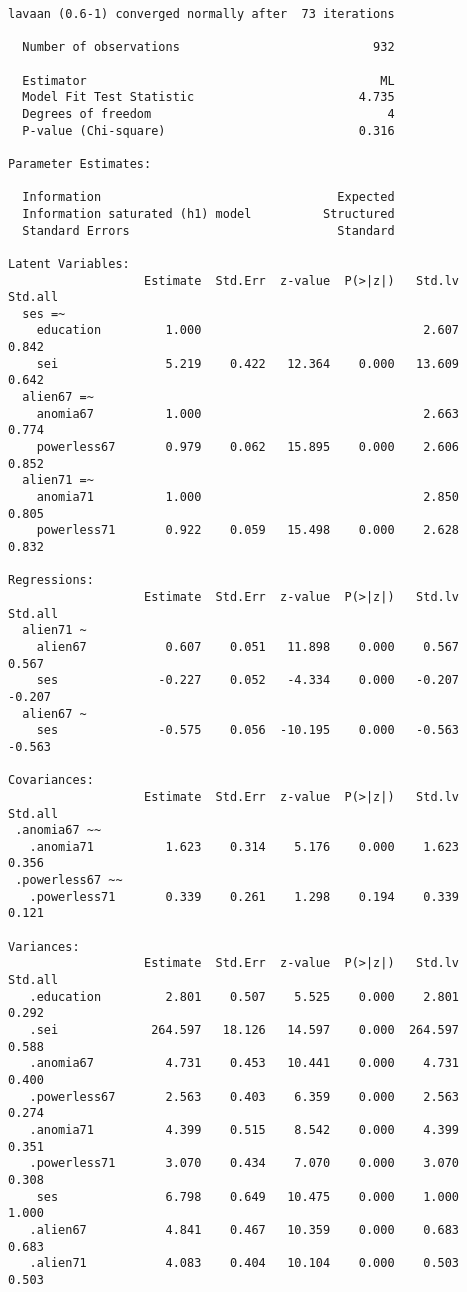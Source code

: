 \begin{verbatim}
lavaan (0.6-1) converged normally after  73 iterations

  Number of observations                           932

  Estimator                                         ML
  Model Fit Test Statistic                       4.735
  Degrees of freedom                                 4
  P-value (Chi-square)                           0.316

Parameter Estimates:

  Information                                 Expected
  Information saturated (h1) model          Structured
  Standard Errors                             Standard

Latent Variables:
                   Estimate  Std.Err  z-value  P(>|z|)   Std.lv  Std.all
  ses =~                                                                
    education         1.000                               2.607    0.842
    sei               5.219    0.422   12.364    0.000   13.609    0.642
  alien67 =~                                                            
    anomia67          1.000                               2.663    0.774
    powerless67       0.979    0.062   15.895    0.000    2.606    0.852
  alien71 =~                                                            
    anomia71          1.000                               2.850    0.805
    powerless71       0.922    0.059   15.498    0.000    2.628    0.832

Regressions:
                   Estimate  Std.Err  z-value  P(>|z|)   Std.lv  Std.all
  alien71 ~                                                             
    alien67           0.607    0.051   11.898    0.000    0.567    0.567
    ses              -0.227    0.052   -4.334    0.000   -0.207   -0.207
  alien67 ~                                                             
    ses              -0.575    0.056  -10.195    0.000   -0.563   -0.563

Covariances:
                   Estimate  Std.Err  z-value  P(>|z|)   Std.lv  Std.all
 .anomia67 ~~                                                           
   .anomia71          1.623    0.314    5.176    0.000    1.623    0.356
 .powerless67 ~~                                                        
   .powerless71       0.339    0.261    1.298    0.194    0.339    0.121

Variances:
                   Estimate  Std.Err  z-value  P(>|z|)   Std.lv  Std.all
   .education         2.801    0.507    5.525    0.000    2.801    0.292
   .sei             264.597   18.126   14.597    0.000  264.597    0.588
   .anomia67          4.731    0.453   10.441    0.000    4.731    0.400
   .powerless67       2.563    0.403    6.359    0.000    2.563    0.274
   .anomia71          4.399    0.515    8.542    0.000    4.399    0.351
   .powerless71       3.070    0.434    7.070    0.000    3.070    0.308
    ses               6.798    0.649   10.475    0.000    1.000    1.000
   .alien67           4.841    0.467   10.359    0.000    0.683    0.683
   .alien71           4.083    0.404   10.104    0.000    0.503    0.503
\end{verbatim}

